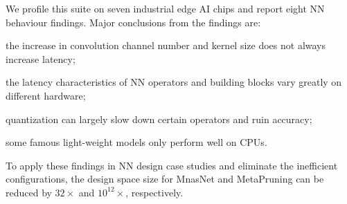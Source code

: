 We profile this suite on seven industrial edge AI chips
and report eight NN behaviour findings. Major conclusions
from the findings are:
\begin{enumerate*}
    \item the increase in convolution channel number and kernel size
    does not always increase latency;
    \item the latency characteristics of NN operators and building
    blocks vary greatly on different hardware;
    \item quantization can largely slow down certain operators and ruin accuracy;
    \item some famous light-weight models only perform well on CPUs.
\end{enumerate*}
To apply these findings in NN design case studies and
eliminate the inefficient configurations, the design space size
for MnasNet and MetaPruning can be reduced by $32\times$ and
$10^{12}\times$, respectively.
